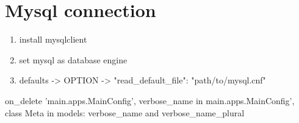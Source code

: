 \documentclass{article}
\begin{document}
	\tableofcontents
	\section{Mysql connection}
	\begin{enumerate}
		\item install mysqlclient
		\item set mysql as database engine
		\item defaults -> OPTION -> "read\_default\_file": "path/to/mysql.cnf"
	\end{enumerate}
	on\_delete
	'main.apps.MainConfig',
	verbose\_name in main.apps.MainConfig',
	class Meta in models: verbose\_name and verbose\_name\_plural
\end{document}
